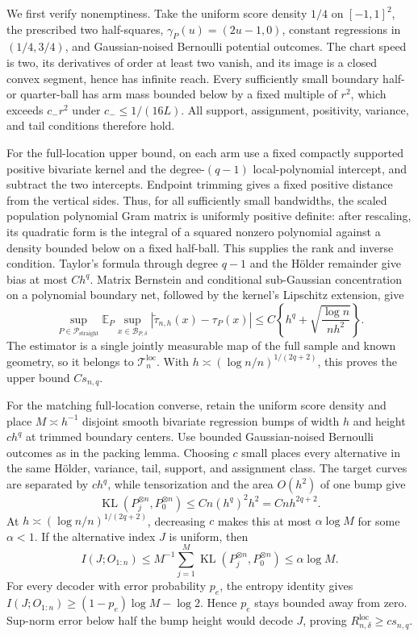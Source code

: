 We first verify nonemptiness.  Take the uniform score density \(1/4\) on \([-1,1]^2\), the prescribed two half-squares, \(\gamma_P(u)=(2u-1,0)\), constant regressions in \((1/4,3/4)\), and Gaussian-noised Bernoulli potential outcomes.  The chart speed is two, its derivatives of order at least two vanish, and its image is a closed convex segment, hence has infinite reach.  Every sufficiently small boundary half- or quarter-ball has arm mass bounded below by a fixed multiple of \(r^2\), which exceeds \(c_-r^2\) under \(c_-\leq1/(16L)\).  All support, assignment, positivity, variance, and tail conditions therefore hold.

For the full-location upper bound, on each arm use a fixed compactly supported positive bivariate kernel and the degree-\((q-1)\) local-polynomial intercept, and subtract the two intercepts.  Endpoint trimming gives a fixed positive distance from the vertical sides.  Thus, for all sufficiently small bandwidths, the scaled population polynomial Gram matrix is uniformly positive definite: after rescaling, its quadratic form is the integral of a squared nonzero polynomial against a density bounded below on a fixed half-ball.  This supplies the rank and inverse condition.  Taylor's formula through degree \(q-1\) and the H\"older remainder give bias at most \(Ch^q\).  Matrix Bernstein and conditional sub-Gaussian concentration on a polynomial boundary net, followed by the kernel's Lipschitz extension, give
\[
 \sup_{P\in\mathcal P_{\mathrm{straight}}}
 \mathbb E_P\sup_{x\in\mathcal B_{P,\delta}}
 |\widetilde\tau_{n,h}(x)-\tau_P(x)|
 \leq C\left\{h^q+\sqrt{\frac{\log n}{nh^2}}\right\}.
\]
The estimator is a single jointly measurable map of the full sample and known geometry, so it belongs to \(\mathcal T_n^{\mathrm{loc}}\).  With \(h\asymp(\log n/n)^{1/(2q+2)}\), this proves the upper bound \(Cs_{n,q}\).

For the matching full-location converse, retain the uniform score density and place \(M\asymp h^{-1}\) disjoint smooth bivariate regression bumps of width \(h\) and height \(c h^q\) at trimmed boundary centers.  Use bounded Gaussian-noised Bernoulli outcomes as in the packing lemma.  Choosing \(c\) small places every alternative in the same H\"older, variance, tail, support, and assignment class.  The target curves are separated by \(ch^q\), while tensorization and the area \(O(h^2)\) of one bump give
\[
 \operatorname{KL}(P_j^{\otimes n},P_0^{\otimes n})
 \leq Cn(h^q)^2h^2=Cnh^{2q+2}.
\]
At \(h\asymp(\log n/n)^{1/(2q+2)}\), decreasing \(c\) makes this at most \(\alpha\log M\) for some \(\alpha<1\).  If the alternative index \(J\) is uniform, then
\[
 I(J;O_{1:n})
 \leq M^{-1}\sum_{j=1}^M\operatorname{KL}(P_j^{\otimes n},P_0^{\otimes n})
 \leq\alpha\log M.
\]
For every decoder with error probability \(p_e\), the entropy identity gives \(I(J;O_{1:n})\geq(1-p_e)\log M-\log2\).  Hence \(p_e\) stays bounded away from zero.  Sup-norm error below half the bump height would decode \(J\), proving \(R_{n,\delta}^{\mathrm{loc}}\geq cs_{n,q}\).

